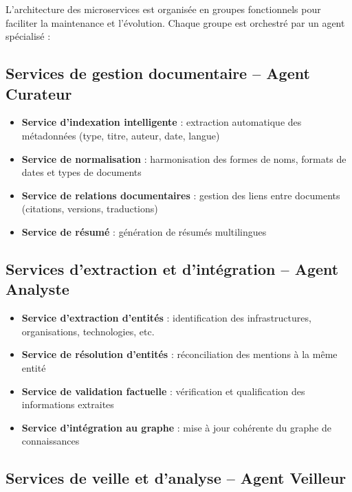 \documentclass[a4paper,11pt]{report}
\providecommand{\tightlist}{\setlength{\itemsep}{0pt}\setlength{\parskip}{0pt}}
\begin{document}
L'architecture des microservices est organisée en groupes fonctionnels pour faciliter la maintenance et l'évolution. Chaque groupe est orchestré par un agent spécialisé :

\subsection{Services de gestion documentaire -- Agent Curateur}\label{services-de-gestion-documentaire-agent-curateur}

\begin{itemize}
\tightlist
\item
  \textbf{Service d'indexation intelligente} : extraction automatique des métadonnées (type, titre, auteur, date, langue)
\item
  \textbf{Service de normalisation} : harmonisation des formes de noms, formats de dates et types de documents
\item
  \textbf{Service de relations documentaires} : gestion des liens entre documents (citations, versions, traductions)
\item
  \textbf{Service de résumé} : génération de résumés multilingues
\end{itemize}

\subsection{Services d'extraction et d'intégration -- Agent Analyste}\label{services-dextraction-et-dintuxe9gration-agent-analyste}

\begin{itemize}
\tightlist
\item
  \textbf{Service d'extraction d'entités} : identification des infrastructures, organisations, technologies, etc.
\item
  \textbf{Service de résolution d'entités} : réconciliation des mentions à la même entité
\item
  \textbf{Service de validation factuelle} : vérification et qualification des informations extraites
\item
  \textbf{Service d'intégration au graphe} : mise à jour cohérente du graphe de connaissances
\end{itemize}

\subsection{Services de veille et d'analyse -- Agent Veilleur}\label{services-de-veille-et-danalyse-agent-veilleur}
\end{document}
